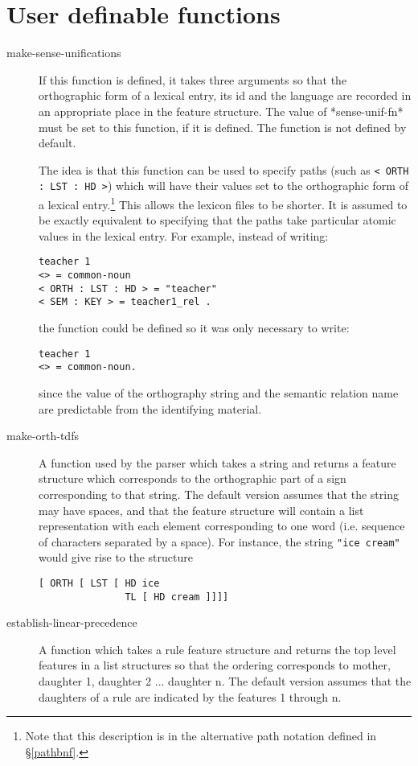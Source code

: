 \documentclass[12pt]{report}
\begin{document}
\section{User definable functions}
\label{userfns}

\begin{description}
\item [make-sense-unifications] If this
function is defined, it takes 
three arguments so that the orthographic form of a lexical
entry, its id and the language are recorded in an appropriate place in
the feature structure.  The value of *sense-unif-fn* must be
set to this function, if it is defined.
The function is not defined by default.

The idea is that this function can be used to specify paths 
(such as \verb+< ORTH : LST : HD >+) which will have their values set to
the orthographic form of a lexical entry.\footnote{Note that
this description is in the alternative path notation defined
in \S\ref{pathbnf}.}
This allows the lexicon files to be shorter.
It is assumed to be exactly equivalent to specifying that the paths take
particular atomic values in the lexical entry.
For example, instead of writing:
\begin{verbatim}
teacher 1 
<> = common-noun
< ORTH : LST : HD > = "teacher"
< SEM : KEY > = teacher1_rel .
\end{verbatim}
the function could be defined so it was only necessary to write:
\begin{verbatim}
teacher 1 
<> = common-noun.
\end{verbatim}
since the value of the orthography string and the semantic relation name are
predictable from the identifying material.


\item[make-orth-tdfs] A function used by the parser
which takes a string and returns a 
feature structure which corresponds to the orthographic part of a sign
corresponding to that string.  The default version assumes that the string may 
have spaces, and that the feature structure will contain a list
representation with each element corresponding to one word (i.e. sequence of
characters separated by a space).  For instance, the string 
\verb+"ice cream"+ would give rise to the structure
\begin{verbatim}
[ ORTH [ LST [ HD ice
               TL [ HD cream ]]]]
\end{verbatim}

\item [establish-linear-precedence] A function which takes a rule 
feature structure and returns the top level features in a list
structures so that the ordering corresponds to mother, daughter 1,
daughter 2 ... daughter n.  The default version assumes that the daughters
of a rule are indicated by the features 1 through n.


\end{description}
\end{document}

